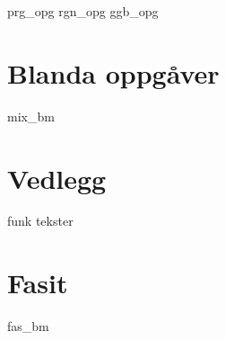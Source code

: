 {prg_opg}
{rgn_opg}	
{ggb_opg}	

\chapter{Blanda oppgåver}
{mix_bm}

\chapter*{Vedlegg} 
\newpage
{}
{funk}
{tekster}

\chapter*{Fasit}
{fas_bm}







